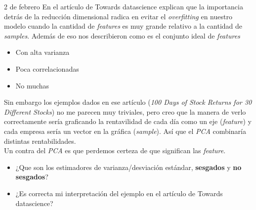 \begin{entry}{2 de febrero}
En el artículo de Towards datascience explican que la importancia detrás de la reducción dimensional radica en evitar el \textit{overfitting} en nuestro modelo cuando la cantidad de \textit{features} es muy grande relativo a la cantidad de \textit{samples}. Además de eso nos describieron como es el conjunto ideal de \textit{features}
\begin{itemize}
    \item Con alta varianza
    \item Poca correlacionadas
    \item No muchas
\end{itemize}
Sin embargo los ejemplos dados en ese artículo (\textit{100 Days of Stock Returns for 30 Different Stocks}) no me parecen muy triviales, pero creo que la manera de verlo correctamente sería graficando la rentavilidad de cada día como un eje (\textit{feature}) y cada empresa sería un vector en la gráfica (\textit{sample}). Así que el \textit{PCA} combinaría distintas rentabilidades.\\

Un contra del \textit{PCA} es que perdemos certeza de que significan las \textit{feature}.
\tcbsubtitle{\LBltodo}\vspace{-1.25em}
\begin{itemize}
    \item ¿Que son los estimadores de varianza/desviación estándar, \textbf{sesgados} y \textbf{no sesgados}?
    
    \item ¿Es correcta mi interpretación del ejemplo en el artículo de Towards datascience?
    \end{itemize}
\end{entry}

